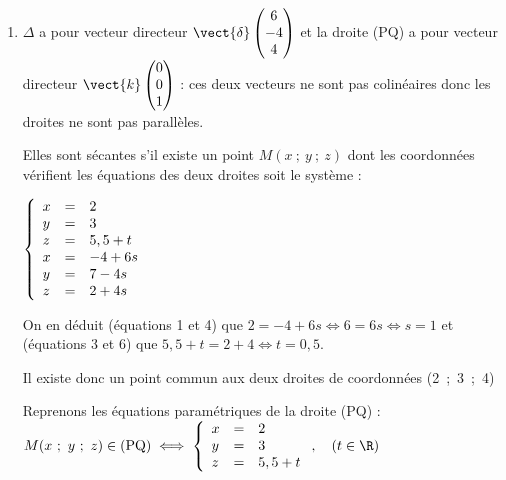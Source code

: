 \begin{enumerate}
\begin{enumerate}
Conclusion : P(2~;~3~;~5).
		\item %
On a PQ$^2 = (2 - 2)^2 + (3 - 3)^2 + (5,5 - 5)^2 = 0,25$ , donc PQ $ = 0,5$.
	\end{enumerate}	

%
%
\item %
$\Delta$ a pour vecteur directeur $\vect{\delta}\begin{pmatrix}6\\-4\\4\end{pmatrix}$ et la droite (PQ) a pour vecteur directeur $\vect{k}\begin{pmatrix}0\\0\\1\end{pmatrix}$ : ces deux vecteurs ne sont pas colinéaires donc les droites ne sont pas parallèles.

Elles sont sécantes s'il existe un point $M(x~;~y~;~z)$ dont les coordonnées vérifient les équations des deux droites soit le système :

$\left\{\begin{array}{l c l}
x &=&2\\
y &=&3\\
z &=&5,5 + t\\
x & =& -4 + 6s\\
y &=& 7 - 4s\\
z &=& 2 + 4s
\end{array}\right.$

 On en déduit (équations 1 et 4) que $2 = - 4 + 6s \iff 6 = 6s \iff s = 1$ et (équations 3 et 6) que $5,5 + t = 2 + 4 \iff t = 0,5.$

Il existe donc un point commun aux deux droites de coordonnées (2~;~3~;~4)

Reprenons les équations paramétriques de la droite (PQ) : $M(x~;~y~;~z) \in (\text{PQ}) \iff \left\{\begin{array}{l c l}
x &=& 2\\
y &=&3\\
z &=&5,5 + t
\end{array}\right., \quad (t \in \R)$


\end{enumerate}
